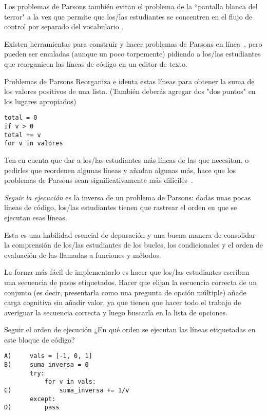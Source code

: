 Los problemas de Parsons  también evitan el problema de la ``pantalla blanca del terror" a la vez que permite que los/las estudiantes se concentren en el flujo de control por separado del vocabulario \cite{Pars2006,Eric2015,Morr2016,Eric2017}.

Existen herramientas para construir y hacer problemas de Parsons en línea~\cite{Ihan2011},
pero pueden ser emuladas (aunque un poco torpemente) 
pidiendo a los/las estudiantes que reorganicen las líneas de código en un editor de texto.

\begin{aside}{Problemas de Parsons}
  Reorganiza e identa estas líneas para obtener la suma de los valores positivos de una lista.
  (También deberás agregar dos "dos puntos" en los lugares apropiados)

\begin{verbatim}
total = 0
if v > 0
total += v
for v in valores
\end{verbatim}
\end{aside}

Ten en cuenta que dar a los/las estudiantes más líneas de las que necesitan, o pedirles que reordenen algunas líneas y añadan algunas más, hace que los problemas de Parsons sean significativamente más difíciles~\cite{Harm2016}.


\emph{Seguir la ejecución} es la inversa de un problema de Parsons: 
dadas unas pocas líneas de código, 
los/las estudiantes tienen que rastrear el orden en que se ejecutan esas líneas.

Esta es una habilidad esencial de depuración 
 y una buena manera de consolidar la comprensión de los/las estudiantes de los bucles, los condicionales y el orden de evaluación de las llamadas a funciones y  métodos.

La forma más fácil de implementarlo es hacer que los/las estudiantes escriban una secuencia de pasos etiquetados.
Hacer que elijan la secuencia correcta de un conjunto 
(es decir, presentarla como una pregunta de opción múltiple) 
añade carga cognitiva sin añadir valor, 
ya que tienen que hacer todo el trabajo de averiguar la secuencia correcta y luego buscarla en la lista de opciones.

\begin{aside}{Seguir el orden de ejecución}
  ¿En qué orden se ejecutan las líneas etiquetadas en este bloque de código?

\begin{verbatim}
A)     vals = [-1, 0, 1]
B)     suma_inversa = 0
       try:
           for v in vals:
C)             suma_inversa += 1/v
       except:
D)         pass
\end{verbatim}
\end{aside}

